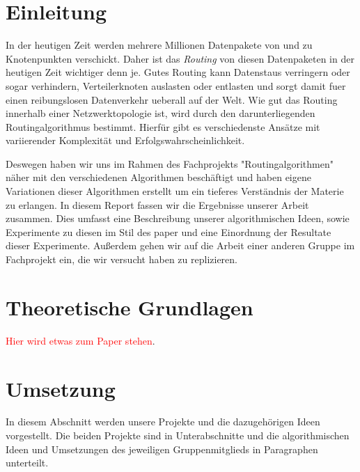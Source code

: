 \documentclass[sigconf, nonacm, review]{acmart}
\begin{document}

\received[\"uberarbeitet]{\textcolor{red}{ausstehend}}

\maketitle

\section{Einleitung}
In der heutigen Zeit werden mehrere Millionen Datenpakete von und zu Knotenpunkten verschickt.
Daher ist das \emph{Routing} von diesen Datenpaketen in der heutigen Zeit wichtiger denn je.
Gutes Routing kann Datenstaus verringern oder sogar verhindern, Verteilerknoten auslasten oder entlasten 
und sorgt damit fuer einen reibungslosen Datenverkehr ueberall auf der Welt.
Wie gut das Routing innerhalb einer Netzwerktopologie ist, wird durch den darunterliegenden Routingalgorithmus bestimmt.
Hierf\"ur gibt es verschiedenste Ans\"atze mit variierender Komplexit\"at und Erfolgswahrscheinlichkeit.

Deswegen haben wir uns im Rahmen des Fachprojekts "Routingalgorithmen" näher mit den verschiedenen Algorithmen beschäftigt und haben eigene Variationen dieser Algorithmen erstellt um ein tieferes Verständnis der Materie zu erlangen.
In diesem Report fassen wir die Ergebnisse unserer Arbeit zusammen.
Dies umfasst eine Beschreibung unserer algorithmischen Ideen, sowie Experimente zu diesen im Stil des paper \cite{foerster2021} und eine Einordnung der Resultate dieser Experimente.
Außerdem gehen wir auf die Arbeit einer anderen Gruppe im Fachprojekt ein, die wir versucht haben zu replizieren.

\section{Theoretische Grundlagen}
\textcolor{red}{Hier wird etwas zum Paper stehen}\cite{foerster2021}.
\section{Umsetzung}
In diesem Abschnitt werden unsere Projekte und die dazugeh\"origen Ideen vorgestellt.
Die beiden Projekte sind in Unterabschnitte und die algorithmischen Ideen und Umsetzungen des jeweiligen Gruppenmitglieds in Paragraphen unterteilt. 
\end{document}
